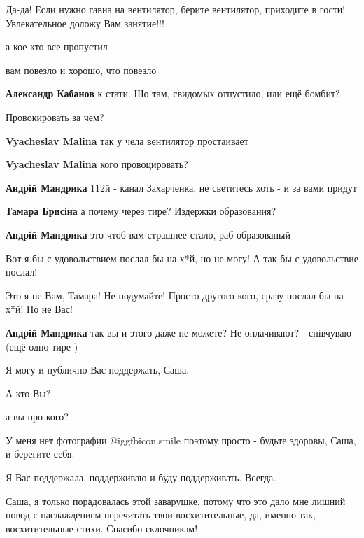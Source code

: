 \begin{itemize}
Да-да! Если нужно гавна на вентилятор, берите вентилятор, приходите в гости! Увлекательное доложу Вам занятие!!!


а кое-кто все пропустил

вам повезло и хорошо, что повезло

\textbf{Александр Кабанов} к стати. Шо там, свидомых отпустило, или ещё бомбит?

\begin{itemize} %
Провокировать за чем?


\textbf{Vyacheslav Malina} так у чела вентилятор простаивает

\textbf{Vyacheslav Malina} кого провоцировать?

\textbf{Андрій Мандрика} 112й - канал Захарченка, не светитесь хоть - и за вами придут

\textbf{Тамара Брисіна} а почему через тире? Издержки образования?

\textbf{Андрій Мандрика} это чтоб вам страшнее стало, раб образованый

Вот я бы с удовольствием послал бы на х*й, но не могу! А так-бы с удовольствие послал!

Это я не Вам, Тамара! Не подумайте! Просто другого кого, сразу послал бы на х*й! Но не Вас!

\textbf{Андрій Мандрика} так вы и этого даже не можете? Не оплачивают? - співчуваю (ещё одно тире )
\end{itemize} %


Я могу и публично Вас поддержать, Саша.

А кто Вы?


а вы про кого?

У меня нет фотографии  @igg{fbicon.smile}  поэтому просто - будьте здоровы, Саша, и берегите себя.

Я Вас поддержала, поддерживаю и буду поддерживать. Всегда.


Саша, я только порадовалась этой заварушке, потому что это дало мне лишний
повод с наслаждением перечитать твои восхитительные, да, именно так,
восхитительные стихи. Спасибо склочникам!



\end{itemize}
